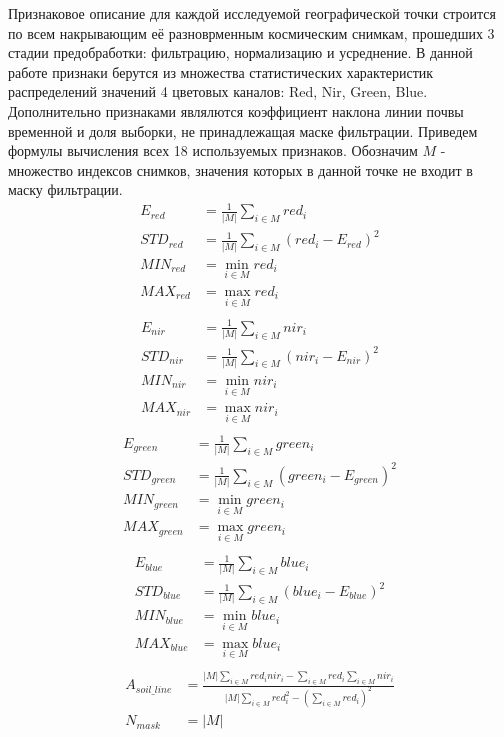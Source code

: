 \documentclass[12pt]{article}
\begin{document}
Признаковое описание для каждой исследуемой географической точки строится по всем накрывающим
её разноврменным космическим снимкам, прошедших 3 стадии предобработки: фильтрацию,
нормализацию и усреднение. В данной работе признаки берутся из множества статистических
характеристик распределений значений 4 цветовых каналов: Red, Nir, Green, Blue. Дополнительно
признаками являлются коэффициент наклона линии почвы временной и доля выборки, не принадлежащая
маске фильтрации. Приведем формулы вычисления всех 18 используемых признаков. Обозначим 
$M$ - множество индексов снимков, значения которых в данной точке не входит в маску фильтрации.
\begin{align*}
    E_{red} &= \frac{1}{|M|}\sum_{i \in M} red_i \\
    STD_{red} &= \frac{1}{|M|}\sum_{i \in M} (red_i - E_{red})^2 \\
    MIN_{red} &= \min_{i \in M} red_i \\
    MAX_{red} &= \max_{i \in M} red_i \\
\end{align*}
\begin{align*}
    E_{nir} &= \frac{1}{|M|}\sum_{i \in M} nir_i \\
    STD_{nir} &= \frac{1}{|M|}\sum_{i \in M} (nir_i - E_{nir})^2 \\
    MIN_{nir} &= \min_{i \in M} nir_i \\
    MAX_{nir} &= \max_{i \in M} nir_i \\
\end{align*}
\begin{align*}
    E_{green} &= \frac{1}{|M|}\sum_{i \in M} green_i \\
    STD_{green} &= \frac{1}{|M|}\sum_{i \in M} (green_i - E_{green})^2 \\
    MIN_{green} &= \min_{i \in M} green_i \\
    MAX_{green} &= \max_{i \in M} green_i \\
\end{align*}
\begin{align*}
    E_{blue} &= \frac{1}{|M|}\sum_{i \in M} blue_i \\
    STD_{blue} &= \frac{1}{|M|}\sum_{i \in M} (blue_i - E_{blue})^2 \\
    MIN_{blue} &= \min_{i \in M} blue_i \\
    MAX_{blue} &= \max_{i \in M} blue_i \\
\end{align*}
\begin{align*}
    A_{soil\_line} &= \frac{|M|\sum_{i \in M} red_i nir_i - 
                            \sum_{i \in M} red_i \sum_{i \in M} nir_i}
                           {|M|\sum_{i \in M} red_i^2 - 
                            \left(\sum_{i \in M} red_i\right)^2} \\
    N_{mask} &= |M|
\end{align*}
\end{document}
